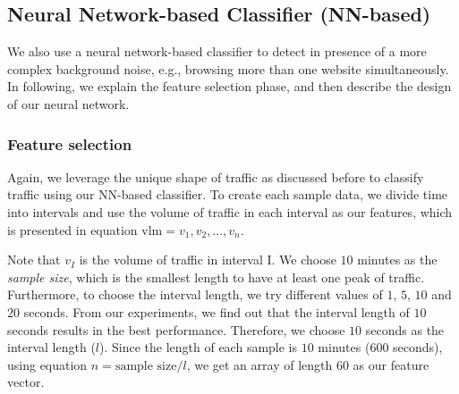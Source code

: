  
\subsection{Neural Network-based Classifier (NN-based)}\label{class:nn}
We also use a neural network-based classifier to detect \bc in presence of a more complex background noise, e.g., browsing more than one website simultaneously. In following, we explain the feature selection phase, and then describe the design of our neural network.
\subsubsection{Feature selection}
Again, we leverage the unique shape of \bc traffic as discussed before to classify \bc traffic using our NN-based classifier. To create each sample data, we divide time into intervals
and use the volume of traffic in each interval as our features, which is 
presented in equation $\mbox{vlm}=v_1, v_2, ..., v_{n}$. 

Note that $v_I$ is the volume of traffic in interval I. We choose $10$ minutes as the \textit{sample size}, which is the smallest length to have
at least one peak of traffic. Furthermore, to choose the interval
length, we try different values of $1$, $5$, $10$ and $20$ seconds. From our experiments, we find out 
that the interval length of $10$ seconds results in the best performance. Therefore, we choose $10$ 
seconds as the interval length ($l$). 
Since the length of each sample is $10$ minutes 
($600$ seconds), using equation $n=\mbox{sample size}/l$, we get an array of 
length $60$ as our feature vector.
\iffalse
\begin{equation}\label{eq:v}
 n=\mbox{sample size}/l
\end{equation}
\begin{equation}\label{eq:a}
\mbox{vlm}=v_1, v_2, ..., v_{n}
\end{equation}\fi
